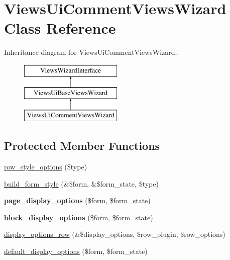 \hypertarget{classViewsUiCommentViewsWizard}{
\section{ViewsUiCommentViewsWizard Class Reference}
\label{classViewsUiCommentViewsWizard}
}
Inheritance diagram for ViewsUiCommentViewsWizard::\begin{figure}[H]
\begin{center}
\leavevmode
\includegraphics[height=3cm]{classViewsUiCommentViewsWizard}
\end{center}
\end{figure}
\subsection*{Protected Member Functions}
\begin{DoxyCompactItemize}
\item 
\hyperlink{classViewsUiCommentViewsWizard_a7cf128d60641d6b2e7125b98c4a7dc14}{row\_\-style\_\-options} (\$type)
\item 
\hyperlink{classViewsUiCommentViewsWizard_aadb538fde884a2f60dc25abd7a3e01e1}{build\_\-form\_\-style} (\&\$form, \&\$form\_\-state, \$type)
\item 
\hypertarget{classViewsUiCommentViewsWizard_a8f2d63e42f37f6499c227beed37feef3}{
{\bfseries page\_\-display\_\-options} (\$form, \$form\_\-state)}
\label{classViewsUiCommentViewsWizard_a8f2d63e42f37f6499c227beed37feef3}

\item 
\hypertarget{classViewsUiCommentViewsWizard_a510eae21d9989a3c61c12aa909b5b5f5}{
{\bfseries block\_\-display\_\-options} (\$form, \$form\_\-state)}
\label{classViewsUiCommentViewsWizard_a510eae21d9989a3c61c12aa909b5b5f5}

\item 
\hyperlink{classViewsUiCommentViewsWizard_a60437279b07fc1fce54c3cb2726b1435}{display\_\-options\_\-row} (\&\$display\_\-options, \$row\_\-plugin, \$row\_\-options)
\item 
\hyperlink{classViewsUiCommentViewsWizard_ab644e65b579971fca2ea8c66405f805f}{default\_\-display\_\-options} (\$form, \$form\_\-state)
\end{DoxyCompactItemize}


